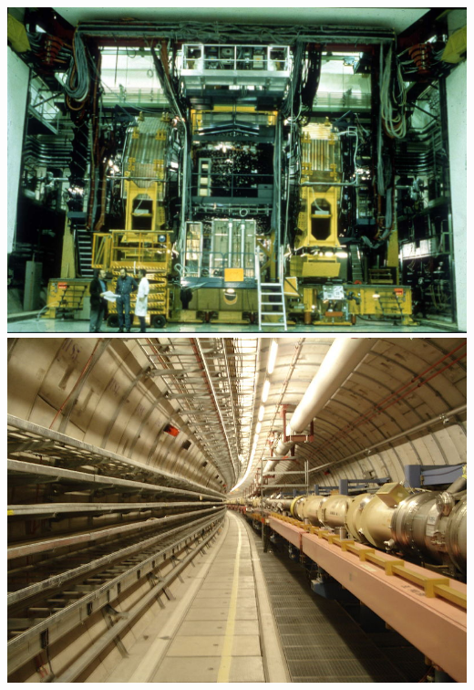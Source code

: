 \marginpar
{
\centering
\includegraphics[width=\marginparwidth]{SM/ua2.jpg}
\label{UA2}
}
\marginpar
{
\centering
\includegraphics[width=\marginparwidth]{SM/HERA.jpg}
\label{HERA}
}
\marginpar
